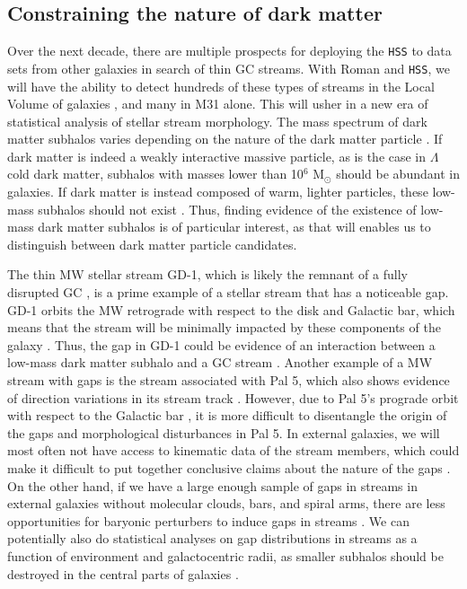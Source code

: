 \documentclass[twocolumn]{aastex631}
\newcommand{\msun}{\textrm{M}_\odot}
\begin{document}
\subsection{Constraining the nature of dark matter}\label{sec:dm}
Over the next  decade,  there  are  multiple prospects for deploying the \texttt{HSS} to data sets from other galaxies in search of thin GC streams. 
With Roman and \texttt{HSS}, we will have the ability to detect hundreds of these types of streams in the Local Volume of galaxies \citep{kara19,pearson19}, and many in M31 alone. 
This will usher in a new era of statistical analysis of stellar stream morphology. The mass spectrum of dark matter subhalos varies depending on the nature of the dark matter particle \citep[e.g.,][]{bohm14}. If dark matter is indeed a weakly interactive massive particle, as is the case in $\Lambda$ cold dark matter, subhalos with masses lower than 10$^{6}$ $\msun$ should be abundant in galaxies. If dark matter is instead composed of warm, lighter particles, these low-mass subhalos should not exist \citep[e.g.,][]{bullock17}. Thus, finding evidence of the existence of low-mass dark matter subhalos is of particular interest, as that will enables us to distinguish between dark matter particle candidates. 

The thin MW stellar stream GD-1, which is likely the remnant of a fully disrupted GC \citep{grillmair06}, is a prime example of a stellar stream that has a noticeable gap. GD-1 orbits the MW retrograde with respect to the disk and Galactic bar, which means that the stream will be minimally impacted by these components of the galaxy \citep[e.g.,][]{hattori16}. Thus, the gap in GD-1 could be evidence of an interaction between a low-mass dark matter subhalo and a GC stream \citep{boer18,price18,bonaca19,bonaca20b}.
Another example of a MW stream with gaps is the stream associated with Pal 5, which also shows evidence of direction variations in its stream track  \citep[e.g.,][]{bonaca20}. However, due to Pal 5's prograde orbit with respect to the Galactic bar \citep[][]{pearson17, erkal17}, it is more difficult to disentangle the origin of the gaps and morphological disturbances in Pal 5. In external galaxies, we will most often not have access to kinematic data of the stream members, which could make it difficult to put together conclusive claims about the nature of the gaps \citep[see e.g., the complex parameter space of GD-1's perturber in the MW in][]{bonaca19,bonaca20b}. 
On the other hand, if we have a large enough sample of gaps in streams in external galaxies without molecular clouds, bars, and spiral arms, there are less opportunities for baryonic perturbers to induce gaps in streams \citep[][]{amorisco16,hattori16,pearson17,erkal17,banik19,pearson19,bonaca20}. We can potentially also do statistical analyses on gap distributions in streams as a function of environment and galactocentric radii, as smaller subhalos should be destroyed in the central parts of galaxies \citep[][]{kimmel17}. 
\end{document}

